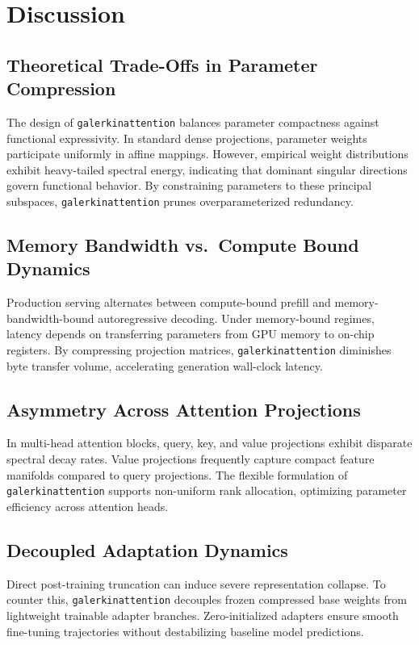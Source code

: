 \section{Discussion}

\subsection{Theoretical Trade-Offs in Parameter Compression}
The design of \texttt{galerkinattention} balances parameter compactness against functional expressivity. In standard dense projections, parameter weights participate uniformly in affine mappings. However, empirical weight distributions exhibit heavy-tailed spectral energy, indicating that dominant singular directions govern functional behavior. By constraining parameters to these principal subspaces, \texttt{galerkinattention} prunes overparameterized redundancy.

\subsection{Memory Bandwidth vs.\ Compute Bound Dynamics}
Production serving alternates between compute-bound prefill and memory-bandwidth-bound autoregressive decoding. Under memory-bound regimes, latency depends on transferring parameters from GPU memory to on-chip registers. By compressing projection matrices, \texttt{galerkinattention} diminishes byte transfer volume, accelerating generation wall-clock latency.

\subsection{Asymmetry Across Attention Projections}
In multi-head attention blocks, query, key, and value projections exhibit disparate spectral decay rates. Value projections frequently capture compact feature manifolds compared to query projections. The flexible formulation of \texttt{galerkinattention} supports non-uniform rank allocation, optimizing parameter efficiency across attention heads.

\subsection{Decoupled Adaptation Dynamics}
Direct post-training truncation can induce severe representation collapse. To counter this, \texttt{galerkinattention} decouples frozen compressed base weights from lightweight trainable adapter branches. Zero-initialized adapters ensure smooth fine-tuning trajectories without destabilizing baseline model predictions.

